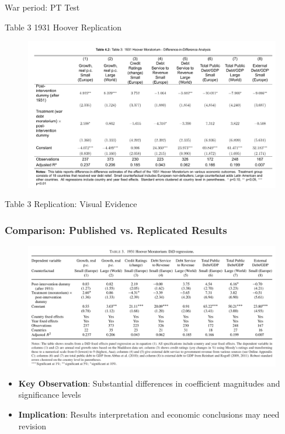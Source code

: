 \documentclass{beamer}
\begin{document}
\begin{frame}{War period: PT Test}
    
\end{frame}

\begin{frame}{Table 3 1931 Hoover Replication}
  \begin{figure}
      \centering
      \includegraphics[width=0.95\linewidth]{figures/tab3_rep.png}
      \label{fig:table3_1931}
  \end{figure}
\end{frame}

\begin{frame}{Table 3 Replication: Visual Evidence}
  \frametitle{Comparison: Published vs. Replicated Results}
  \begin{figure}
      \centering
      \includegraphics[width=0.95\linewidth]{figures/table3_original.png}
  \end{figure}
  \begin{itemize}
    \item \textbf{Key Observation}: Substantial differences in coefficient magnitudes and significance levels
    \item \textbf{Implication}: Results interpretation and economic conclusions may need revision
  \end{itemize}
\end{frame}
\end{document}
